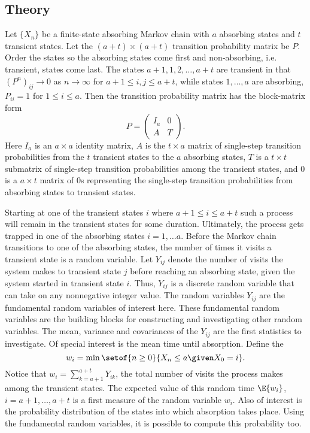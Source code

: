 \documentclass[12pt]{article}
\begin{document}
\subsection*{Theory}

Let \( \{ X_n \} \) be a finite-state absorbing Markov chain with \( a \)
absorbing states and \( t \) transient states.  Let the \( (a + t)
\times (a + t) \) transition probability matrix be \( P \).  Order the
states so the absorbing states come first and non-absorbing, i.e.\ %
transient, states come last.  The states \( a+1, 1, 2, \dots, a+t \) are
transient in that \(\left( P^n \right)_{ij} \to 0 \) as \( n \to \infty \) for \(
a+1 \le i,j \le a+t \), while states \( 1, \dots, a \) are absorbing, \(
P_{ii} = 1 \) for \( 1 \le i \le a \). Then the transition probability
matrix has the block-matrix form
\[
    P =
    \begin{pmatrix}
        I_a & 0 \\
        A & T
    \end{pmatrix}
    .
\] Here \( I_{a} \) is an \( a \times a \) identity matrix, \( A \) is
the \( t \times a \) matrix of single-step transition probabilities from
the \( t \) transient states to the \( a \) absorbing states, \( T \) is
a \( t \times t \) submatrix of single-step transition probabilities
among the transient states, and \( 0 \) is a \( a \times t \) matrix of \(
0 \)s representing the single-step transition probabilities from
absorbing states to transient states.

Starting at one of the transient states \( i \) where \( a+1 \le i \le
a+t \) such a process will remain in the transient states for some
duration.  Ultimately, the process gets trapped in one of the absorbing
states \( i = 1, \dots a \).  Before the Markov chain transitions to one
of the absorbing states, the number of times it visits a transient state
is a random variable.  Let \( Y_{ij} \) denote the number of visits the
system makes to transient state \( j \) before reaching an absorbing
state, given the system started in transient state \( i \).  Thus, \( Y_
{ij} \) is a discrete random variable that can take on any nonnegative
integer value.  The random variables \( Y_{ij} \) are the fundamental
random variables of interest here.  These fundamental random variables
are the building blocks for constructing and investigating other random
variables.  The mean, variance and covariances of the \( Y_{ij} \) are
the first statistics to investigate.  Of special interest is the mean
time until absorption.%
Define the %
\[
    w_i = \min \setof{n \ge 0}{X_n \le a \given X_0 = i}.
\] Notice that \( w_i = \sum_ {k=a+1}^{a+t} Y_{ik} \), the total number of
visits the process makes among the transient states. The expected value
of this random time \( \E{w_i} \), \( i = a+1, \dots, a+t \) is a first
measure of the random variable \( w_i \).  Also of interest is the
probability distribution of the states into which absorption takes
place.  Using the fundamental random variables, it is possible to
compute this probability too.
\end{document}
